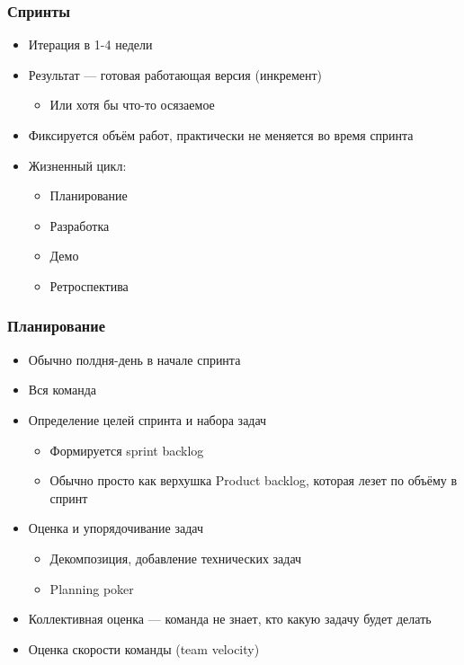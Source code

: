 \documentclass[xetex,mathserif,serif]{beamer}
\begin{document}
    \begin{frame}
        \frametitle{Спринты}
        \begin{itemize}
            \item Итерация в 1-4 недели
            \item Результат --- готовая работающая версия (инкремент)
            \begin{itemize}
                \item Или хотя бы что-то осязаемое
            \end{itemize}
            \item Фиксируется объём работ, практически не меняется во время спринта
            \item Жизненный цикл:
            \begin{itemize}
                \item Планирование
                \item Разработка
                \item Демо
                \item Ретроспектива
            \end{itemize}
        \end{itemize}
    \end{frame}

    \begin{frame}
        \frametitle{Планирование}
        \begin{itemize}
            \item Обычно полдня-день в начале спринта
            \item Вся команда
            \item Определение целей спринта и набора задач
            \begin{itemize}
                \item Формируется sprint backlog
                \item Обычно просто как верхушка Product backlog, которая лезет по объёму в спринт
            \end{itemize}
            \item Оценка и упорядочивание задач
            \begin{itemize}
                \item Декомпозиция, добавление технических задач
                \item Planning poker
            \end{itemize}
            \item Коллективная оценка --- команда не знает, кто какую задачу будет делать
            \item Оценка скорости команды (team velocity)
        \end{itemize}
    \end{frame}
\end{document}
